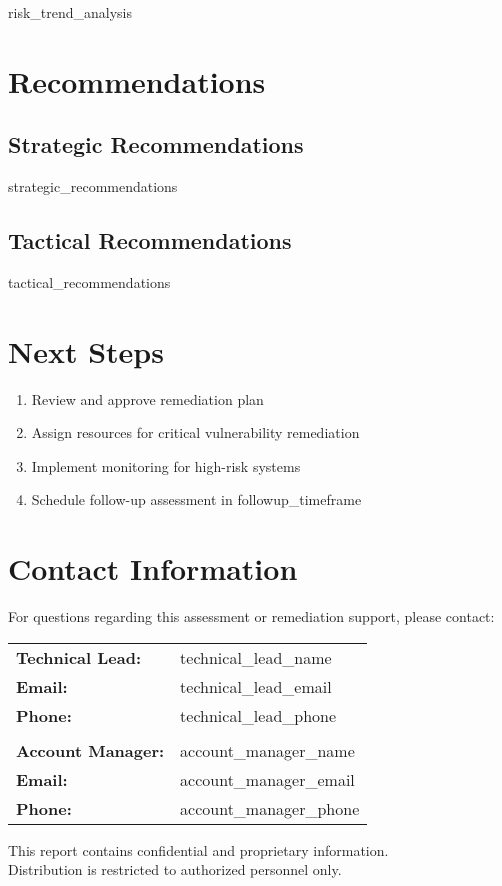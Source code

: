 \documentclass[11pt,a4paper]{article}
\begin{document}
{{risk_trend_analysis}}

\section{Recommendations}

\subsection{Strategic Recommendations}
\begin{itemize}
    {{strategic_recommendations}}
\end{itemize}

\subsection{Tactical Recommendations}
\begin{itemize}
    {{tactical_recommendations}}
\end{itemize}

\section{Next Steps}

\begin{enumerate}
    \item Review and approve remediation plan
    \item Assign resources for critical vulnerability remediation
    \item Implement monitoring for high-risk systems
    \item Schedule follow-up assessment in {{followup_timeframe}}
\end{enumerate}

\section{Contact Information}

For questions regarding this assessment or remediation support, please contact:

\begin{center}
\begin{tabular}{ll}
\textbf{Technical Lead:} & {{technical_lead_name}} \\
\textbf{Email:} & {{technical_lead_email}} \\
\textbf{Phone:} & {{technical_lead_phone}} \\
\\
\textbf{Account Manager:} & {{account_manager_name}} \\
\textbf{Email:} & {{account_manager_email}} \\
\textbf{Phone:} & {{account_manager_phone}} \\
\end{tabular}
\end{center}

\vfill

\begin{center}
\textcolor{secondarycolor}{\small
This report contains confidential and proprietary information. \\
Distribution is restricted to authorized personnel only.
}
\end{center}
\end{document}
